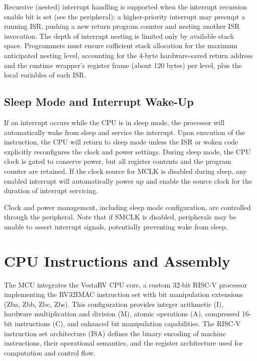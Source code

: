 \documentclass[11pt,pdftex,portrait,letterpaper]{article}
\begin{document}
Recursive (nested) interrupt handling is supported when the interrupt recursion enable bit is set (see the  peripheral): a higher-priority interrupt may preempt a running ISR, pushing a new return program counter and nesting another ISR invocation. The depth of interrupt nesting is limited only by available stack space. Programmers must ensure sufficient stack allocation for the maximum anticipated nesting level, accounting for the 4-byte hardware-saved return address and the runtime wrapper's register frame (about 120 bytes) per level, plus the local variables of each ISR.

\subsection{Sleep Mode and Interrupt Wake-Up}

If an interrupt occurs while the CPU is in sleep mode, the processor will automatically wake from sleep and service the interrupt. Upon execution of the  instruction, the CPU will return to sleep mode unless the ISR or woken code explicitly reconfigures the clock and power settings. During sleep mode, the CPU clock is gated to conserve power, but all register contents and the program counter are retained. If the clock source for MCLK is disabled during sleep, any enabled interrupt will automatically power up and enable the source clock for the duration of interrupt servicing.

Clock and power management, including sleep mode configuration, are controlled through the  peripheral. Note that if SMCLK is disabled, peripherals may be unable to assert interrupt signals, potentially preventing wake from sleep.

\newpage



\section{CPU Instructions and Assembly} \label{s:cpu-instructions}

The \AsicNameForUserGuide{} MCU integrates the VestaRV CPU core, a custom 32-bit RISC-V processor implementing the RV32IMAC instruction set with bit manipulation extensions (Zba, Zbb, Zbc, Zbs). This configuration provides integer arithmetic (I), hardware multiplication and division (M), atomic operations (A), compressed 16-bit instructions (C), and enhanced bit manipulation capabilities. The RISC-V instruction set architecture (ISA) defines the binary encoding of machine instructions, their operational semantics, and the register architecture used for computation and control flow.
\end{document}
